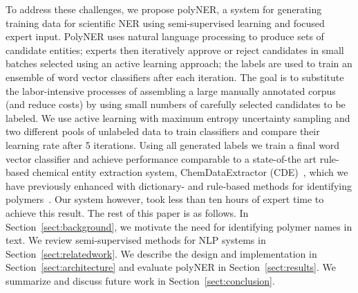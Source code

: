 To address these challenges, we propose polyNER, a system for generating training data for scientific NER using semi-supervised learning and focused expert input. 
PolyNER uses natural language processing to produce sets of candidate entities;
experts then iteratively approve or reject candidates in small batches selected using an active learning approach;
the labels are used to train an ensemble of word vector classifiers after each iteration.
The goal is
to substitute the labor-intensive processes of assembling a large
manually annotated corpus (and reduce costs) by using small numbers of carefully selected candidates to be labeled. 
We use active learning with maximum entropy uncertainty sampling and two different pools of unlabeled data to train classifiers and compare their learning rate after 5 iterations. 
Using all generated labels we train a final word vector classifier and achieve performance comparable to 
a state-of-the art rule-based chemical entity extraction
system, ChemDataExtractor (CDE)~\cite{swain2016chemdataextractor}, which we have previously enhanced
with dictionary- and rule-based methods for identifying polymers~\cite{tchoua2017towards}.
Our system however, took less than ten hours of expert time to achieve this result.
The rest of this paper is as follows. 
In Section~\ref{sect:background}, we motivate the need for identifying polymer names in
text. 
We review semi-supervised methods for NLP systems in
Section~\ref{sect:relatedwork}. 
We describe the design and implementation in Section~\ref{sect:architecture} and evaluate polyNER
in Section~\ref{sect:results}. We summarize and discuss future work in Section~\ref{sect:conclusion}.